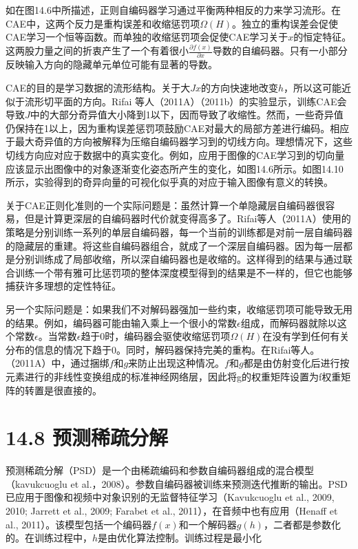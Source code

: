如在图14.6中所描述，正则自编码器学习通过平衡两种相反的力来学习流形。在CAE中，这两个反力是重构误差和收缩惩罚项$\Omega(H)$。独立的重构误差会促使CAE学习一个恒等函数。而单独的收缩惩罚项会促使CAE学习关于$x$的恒定特征。这两股力量之间的折衷产生了一个有着很小$\frac{\partial f(x)}{\partial x}$导数的自编码器。只有一小部分反映输入方向的隐藏单元单位可能有显著的导数。

CAE的目的是学习数据的流形结构。关于大$Jx$的方向快速地改变$h$，所以这可能近似于流形切平面的方向。Rifai 等人（2011A）（2011b）的实验显示，训练CAE会导致$J$中的大部分奇异值大小降到1以下，因而导致了收缩性。然而，一些奇异值仍保持在1以上，因为重构误差惩罚项鼓励CAE对最大的局部方差进行编码。相应于最大奇异值的方向被解释为压缩自编码器学习到的切线方向。理想情况下，这些切线方向应对应于数据中的真实变化。例如，应用于图像的CAE学习到的切向量应该显示出图像中的对象逐渐变化姿态所产生的变化，如图14.6所示。如图14.10所示，实验得到的奇异向量的可视化似乎真的对应于输入图像有意义的转换。

关于CAE正则化准则的一个实际问题是：虽然计算一个单隐藏层自编码器很容易，但是计算更深层的自编码器时代价就变得高多了。Rifai等人（2011A）使用的策略是分别训练一系列的单层自编码器，每一个当前的训练都是对前一层自编码器的隐藏层的重建。将这些自编码器组合，就成了一个深层自编码器。因为每一层都是分别训练成了局部收缩，所以深自编码器也是收缩的。这样得到的结果与通过联合训练一个带有雅可比惩罚项的整体深度模型得到的结果是不一样的，但它也能够捕获许多理想的定性特征。


另一个实际问题是：如果我们不对解码器强加一些约束，收缩惩罚项可能导致无用的结果。例如，编码器可能由输入乘上一个很小的常数$\epsilon$组成，而解码器就除以这个常数$\epsilon$。当常数$\epsilon$趋于0时，编码器会驱使收缩惩罚项$\Omega(H)$在没有学到任何有关分布的信息的情况下趋于0。同时，解码器保持完美的重构。在Rifai等人。（2011A）中，通过捆绑$f$和$g$来防止出现这种情况。$f$和$g$都是由仿射变化后进行按元素进行的非线性变换组成的标准神经网络层，因此将g的权重矩阵设置为f权重矩阵的转置是很直接的。

\section{14.8 预测稀疏分解}
预测稀疏分解（PSD）是一个由稀疏编码和参数自编码器组成的混合模型（kavukcuoglu et al.，2008）。参数自编码器被训练来预测迭代推断的输出。PSD已应用于图像和视频中对象识别的无监督特征学习（Kavukcuoglu et al., 2009, 2010; Jarrett et al., 2009; Farabet et al., 2011），在音频中也有应用（Henaff et al., 2011）。该模型包括一个编码器$f(x)$和一个解码器$g(h)$，二者都是参数化的。在训练过程中，$h$是由优化算法控制。训练过程是最小化

